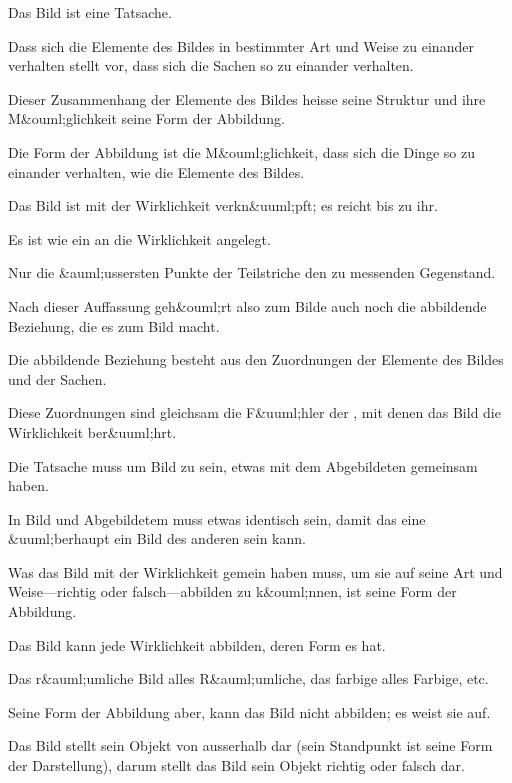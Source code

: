 {Das Bild ist eine Tatsache.}


{Dass sich die Elemente des Bildes in bestimmter
Art und Weise zu einander verhalten stellt vor,
dass sich die Sachen so zu einander verhalten.

Dieser Zusammenhang der Elemente des Bildes
heisse seine Struktur und ihre M&ouml;glichkeit seine
Form der Abbildung.}


{Die Form der Abbildung ist die M&ouml;glichkeit,
dass sich die Dinge so zu einander verhalten, wie
die Elemente des Bildes.}


{Das Bild ist  mit der Wirklichkeit verkn&uuml;pft;
es reicht bis zu ihr.}


{Es ist wie ein  an die Wirklichkeit
angelegt.}


{Nur die &auml;ussersten Punkte der Teilstriche
 den zu messenden Gegenstand.}


{Nach dieser Auffassung geh&ouml;rt also zum Bilde
auch noch die abbildende Beziehung, die es zum
Bild macht.}


{Die abbildende Beziehung besteht aus den
Zuordnungen der Elemente des Bildes und der
Sachen.}


{Diese Zuordnungen sind gleichsam die F&uuml;hler
der , mit denen das Bild die Wirklichkeit
ber&uuml;hrt.}


{Die Tatsache muss um Bild zu sein, etwas mit
dem Abgebildeten gemeinsam haben.}


{In Bild und Abgebildetem muss etwas identisch
sein, damit das eine &uuml;berhaupt ein Bild des anderen
sein kann.}


{Was das Bild mit der Wirklichkeit gemein
haben muss, um sie auf seine Art und Weise---richtig
oder falsch---abbilden zu k&ouml;nnen, ist seine
Form der Abbildung.}


{Das Bild kann jede Wirklichkeit abbilden,
deren Form es hat.

Das r&auml;umliche Bild alles R&auml;umliche, das farbige
alles Farbige, etc.}


{Seine Form der Abbildung aber, kann das Bild
nicht abbilden; es weist sie auf.}


{Das Bild stellt sein Objekt von ausserhalb dar
(sein Standpunkt ist seine Form der Darstellung),
darum stellt das Bild sein Objekt richtig oder
falsch dar.}



